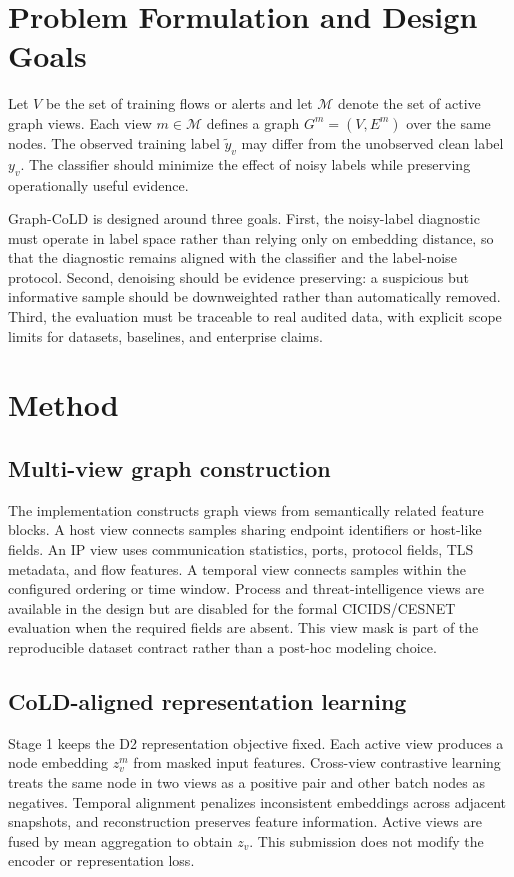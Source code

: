 \documentclass[preprint,review,12pt]{elsarticle}
\begin{document}
\section{Problem Formulation and Design Goals}
Let $V$ be the set of training flows or alerts and let
$\mathcal{M}$ denote the set of active graph views. Each view
$m\in\mathcal{M}$ defines a graph $G^m=(V,E^m)$ over the same nodes. The
observed training label $\tilde y_v$ may differ from the unobserved clean label
$y_v$. The classifier should minimize the effect of noisy labels while preserving
operationally useful evidence.

Graph-CoLD is designed around three goals. First, the noisy-label diagnostic must
operate in label space rather than relying only on embedding distance, so that
the diagnostic remains aligned with the classifier and the label-noise protocol.
Second, denoising should be evidence preserving: a suspicious but informative
sample should be downweighted rather than automatically removed. Third, the
evaluation must be traceable to real audited data, with explicit scope limits for
datasets, baselines, and enterprise claims.

\section{Method}
\subsection{Multi-view graph construction}
The implementation constructs graph views from semantically related feature
blocks. A host view connects samples sharing endpoint identifiers or host-like
fields. An IP view uses communication statistics, ports, protocol fields, TLS
metadata, and flow features. A temporal view connects samples within the
configured ordering or time window. Process and threat-intelligence views are
available in the design but are disabled for the formal CICIDS/CESNET evaluation
when the required fields are absent. This view mask is part of the reproducible
dataset contract rather than a post-hoc modeling choice.

\subsection{CoLD-aligned representation learning}
Stage 1 keeps the D2 representation objective fixed. Each active view produces a
node embedding $z_v^m$ from masked input features. Cross-view contrastive
learning treats the same node in two views as a positive pair and other batch
nodes as negatives. Temporal alignment penalizes inconsistent embeddings across
adjacent snapshots, and reconstruction preserves feature information. Active
views are fused by mean aggregation to obtain $z_v$. This submission does not modify the
encoder or representation loss.
\end{document}
